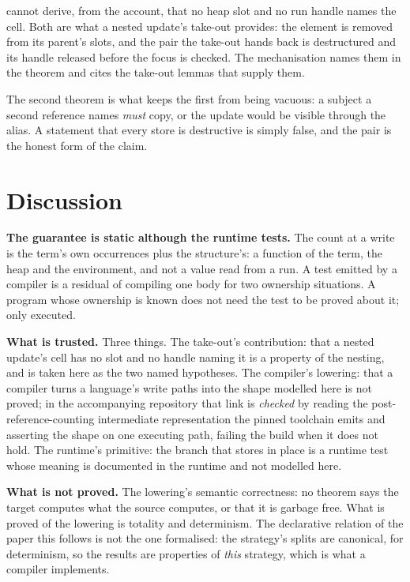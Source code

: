 \documentclass[11pt]{article}
\newcommand{\code}[1]{\texttt{\detokenize{#1}}}
\newcommand{\lref}[1]{\code{#1}}
\theoremstyle{remark}
\begin{document}
\noindent \lref{store_owned_is_destructive} cannot derive, from the account, that no
heap slot and no run handle names the cell. Both are what a nested update's take-out
provides: the element is removed from its parent's slots, and the pair the take-out
hands back is destructured and its handle released before the focus is checked. The
mechanisation names them in the theorem and cites the take-out lemmas that supply
them.

\noindent The second theorem is what keeps the first from being vacuous: a subject a
second reference names \emph{must} copy, or the update would be visible through the
alias. A statement that every store is destructive is simply false, and the pair is
the honest form of the claim.

\section{Discussion}

\noindent \textbf{The guarantee is static although the runtime tests.} The count at
a write is the term's own occurrences plus the structure's: a function of the term,
the heap and the environment, and not a value read from a run. A test emitted by a
compiler is a residual of compiling one body for two ownership situations. A program
whose ownership is known does not need the test to be proved about it; only
executed.

\noindent \textbf{What is trusted.} Three things. The take-out's contribution: that
a nested update's cell has no slot and no handle naming it is a property of the
nesting, and is taken here as the two named hypotheses. The compiler's lowering:
that a compiler turns a language's write paths into the shape modelled here is not
proved; in the accompanying repository that link is \emph{checked} by reading the
post-reference-counting intermediate representation the pinned toolchain emits and
asserting the shape on one executing path, failing the build when it does not hold.
The runtime's primitive: the branch that stores in place is a runtime test whose
meaning is documented in the runtime and not modelled here.

\noindent \textbf{What is not proved.} The lowering's semantic correctness: no
theorem says the target computes what the source computes, or that it is garbage
free. What is proved of the lowering is totality and determinism. The declarative
relation of the paper this follows is not the one formalised: the strategy's splits
are canonical, for determinism, so the results are properties of \emph{this}
strategy, which is what a compiler implements.
\end{document}
